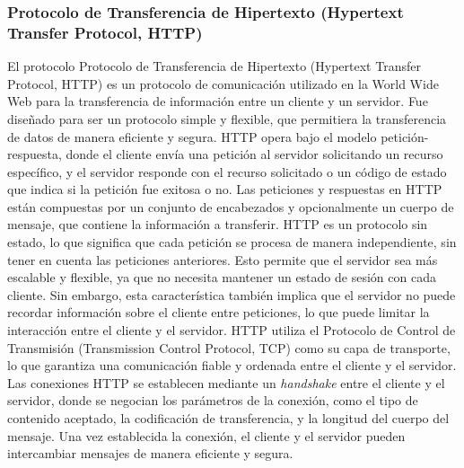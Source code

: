 \subsubsection{Protocolo de Transferencia de Hipertexto (Hypertext Transfer Protocol, HTTP)} %
\label{ssub:HTTP}

    El protocolo Protocolo de Transferencia de Hipertexto (Hypertext Transfer Protocol, HTTP) es un protocolo de comunicaci\'on utilizado en 
        la World Wide Web para la transferencia de informaci\'on entre un cliente y un servidor. 
        Fue dise\~nado para ser un protocolo simple y flexible, que permitiera la transferencia 
        de datos de manera eficiente y segura. \cite{RFC2616}
    \vskip 0.5cm
        HTTP opera bajo el modelo petici\'on-respuesta, donde el cliente env\'ia una petici\'on al servidor 
            solicitando un recurso espec\'ifico, y el servidor responde con el recurso solicitado o un c\'odigo 
            de estado que indica si la petici\'on fue exitosa o no. Las peticiones y respuestas en HTTP est\'an 
            compuestas por un conjunto de encabezados y opcionalmente un cuerpo de mensaje, que contiene la 
            informaci\'on a transferir. \cite{RFC2616}
    \vskip 0.5cm
        HTTP es un protocolo sin estado, lo que significa que cada petici\'on se procesa de manera independiente, 
            sin tener en cuenta las peticiones anteriores. Esto permite que el servidor sea m\'as escalable y 
            flexible, ya que no necesita mantener un estado de sesi\'on con cada cliente. Sin embargo, esta 
            caracter\'istica tambi\'en implica que el servidor no puede recordar informaci\'on sobre el cliente 
            entre peticiones, lo que puede limitar la interacci\'on entre el cliente y el servidor. \cite{RFC2616}
    \vskip 0.5cm
        HTTP utiliza el Protocolo de Control de Transmisi\'on (Transmission Control Protocol, TCP) como su capa de transporte, lo que garantiza 
            una comunicaci\'on fiable y ordenada entre el cliente y el servidor. Las conexiones HTTP se establecen 
            mediante un \textit{handshake} entre el cliente y el servidor, donde se negocian los par\'ametros de la 
            conexi\'on, como el tipo de contenido aceptado, la codificaci\'on de transferencia, y la longitud del 
            cuerpo del mensaje. Una vez establecida la conexi\'on, el cliente y el servidor pueden intercambiar 
            mensajes de manera eficiente y segura. \cite{RFC2616}
    \vskip 0.5cm

